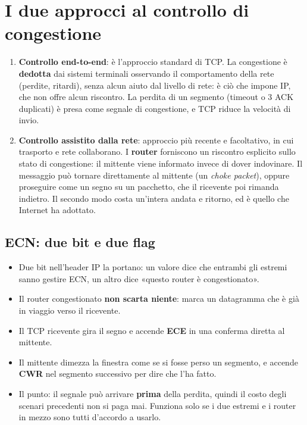\section{I due approcci al controllo di congestione}

\begin{enumerate}
    \item \textbf{Controllo end-to-end}: è l'approccio standard di TCP. La congestione è \textbf{dedotta} dai sistemi
          terminali osservando il comportamento della rete (perdite, ritardi), senza alcun aiuto dal livello di rete: è
          ciò che impone IP, che non offre alcun riscontro. La perdita di un segmento (timeout o 3 ACK duplicati) è presa
          come segnale di congestione, e TCP riduce la velocità di invio.
    \item \textbf{Controllo assistito dalla rete}: approccio più recente e facoltativo, in cui trasporto e rete
          collaborano. I \textbf{router} forniscono un riscontro esplicito sullo stato di congestione: il mittente viene
          informato invece di dover indovinare. Il messaggio può tornare direttamente al mittente (un \emph{choke packet}),
          oppure proseguire come un segno su un pacchetto, che il ricevente poi rimanda indietro. Il secondo modo costa
          un'intera andata e ritorno, ed è quello che Internet ha adottato.
\end{enumerate}

\subsection{ECN: due bit e due flag}

\begin{itemize}
    \item Due bit nell'header IP la portano: un valore dice che entrambi gli estremi sanno gestire ECN, un altro dice
          «questo router è congestionato».
    \item Il router congestionato \textbf{non scarta niente}: marca un datagramma che è già in viaggio verso il ricevente.
    \item Il TCP ricevente gira il segno e accende \textbf{ECE} in una conferma diretta al mittente.
    \item Il mittente dimezza la finestra come se si fosse perso un segmento, e accende \textbf{CWR} nel segmento successivo
          per dire che l'ha fatto.
    \item Il punto: il segnale può arrivare \textbf{prima} della perdita, quindi il costo degli scenari precedenti non si
          paga mai. Funziona solo se i due estremi e i router in mezzo sono tutti d'accordo a usarlo.
\end{itemize}

